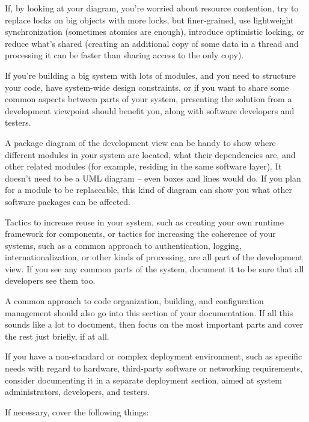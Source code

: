 If, by looking at your diagram, you're worried about resource contention, try to replace locks on big objects with more locks, but finer-grained, use lightweight synchronization (sometimes atomics are enough), introduce optimistic locking, or reduce what's shared (creating an additional copy of some data in a thread and processing it can be faster than sharing access to the only copy).


If you're building a big system with lots of modules, and you need to structure your code, have system-wide design constraints, or if you want to share some common aspects  between parts of your system, presenting the solution from a development viewpoint should benefit you, along with software developers and testers.

A package diagram of the development view can be handy to show where different modules in your system are located, what their dependencies are, and other related modules (for example, residing in the same software layer). It doesn't need to be a UML diagram – even boxes and lines would do. If you plan for a module to be replaceable, this kind of diagram can show you what other software packages can be affected.

Tactics to increase reuse in your system, such as creating your own runtime framework for components, or tactics for increasing the coherence of your systems, such as a common approach to authentication, logging, internationalization, or other kinds of processing, are all part of the development view. If you see any common parts of the system, document it to be sure that all developers see them too.

A common approach to code organization, building, and configuration management should also go into this section of your documentation. If all this sounds like a lot to document, then focus on the most important parts and cover the rest just briefly, if at all.


If you have a non-standard or complex deployment environment, such as specific needs with regard to hardware, third-party software or networking requirements, consider documenting it in a separate deployment section, aimed at system administrators, developers, and testers.

If necessary, cover the following things:

